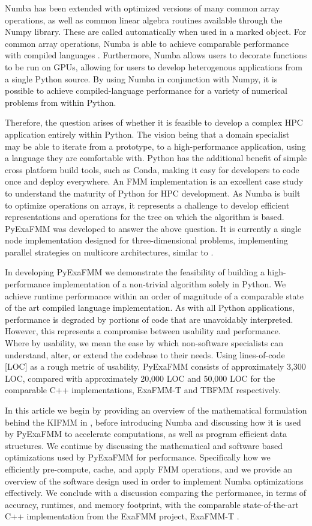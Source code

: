 \documentclass{IEEEcsmag}
\begin{document}
Numba has been extended with optimized versions of many common array operations, as well as common linear algebra routines available through the Numpy library. These are called automatically when used in a marked object. For common array operations, Numba is able to achieve comparable performance with compiled languages \cite{Lam2015}. Furthermore, Numba allows users to decorate functions to be run on GPUs, allowing for users to develop heterogenous applications from a single Python source. By using Numba in conjunction with Numpy, it is possible to achieve compiled-language performance for a variety of numerical problems from within Python.

Therefore, the question arises of whether it is feasible to develop a complex HPC application entirely within Python. The vision being that a domain specialist may be able to iterate from a prototype, to a high-performance application, using a language they are comfortable with. Python has the additional benefit of simple cross platform build tools, such as Conda, making it easy for developers to code once and deploy everywhere. An FMM implementation is an excellent case study to understand the maturity of Python for HPC development. As Numba is built to optimize operations on arrays, it represents a challenge to develop efficient representations and operations for the tree on which the algorithm is based. PyExaFMM was developed to answer the above question. It is currently a single node implementation designed for three-dimensional problems, implementing parallel strategies on multicore architectures, similar to \cite{Bramas2020, Wang2021}.

In developing PyExaFMM we demonstrate the feasibility of building a high-performance implementation of a non-trivial algorithm solely in Python. We achieve runtime performance within an order of magnitude of a comparable state of the art compiled language implementation. As with all Python applications, performance is degraded by portions of code that are unavoidably interpreted. However, this represents a compromise between usability and performance. Where by usability, we mean the ease by which non-software specialists can understand, alter, or extend the codebase to their needs. Using lines-of-code [LOC] as a rough metric of usability, PyExaFMM consists of approximately 3,300 LOC, compared with approximately 20,000 LOC and 50,000 LOC for the comparable C++ implementations, ExaFMM-T \cite{Wang2021} and TBFMM \cite{Bramas2020} respectively.

In this article we begin by providing an overview of the mathematical formulation behind the KIFMM in \cite{Ying2004}, before introducing Numba and discussing how it is used by PyExaFMM to accelerate computations, as well as program efficient data structures. We continue by discussing the mathematical and software based optimizations used by PyExaFMM for performance. Specifically how we efficiently pre-compute, cache, and apply FMM operations, and we provide an overview of the software design used in order to implement Numba optimizations effectively. We conclude with a discussion comparing the performance, in terms of accuracy, runtimes, and memory footprint, with the comparable state-of-the-art C++ implementation from the ExaFMM project, ExaFMM-T \cite{Wang2021}.
\end{document}
